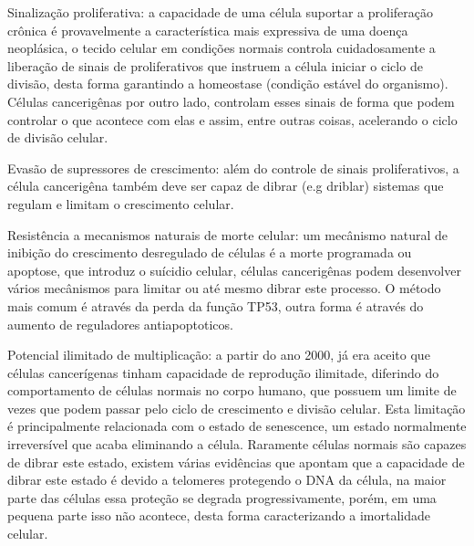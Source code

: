 \documentclass[12pt]{article}
\begin{document}
Sinalização proliferativa: a capacidade de uma célula suportar a proliferação crônica é provavelmente a característica mais expressiva de uma doença neoplásica, o tecido celular em condições normais controla cuidadosamente a liberação de sinais de proliferativos que instruem a célula iniciar o ciclo de divisão, desta forma garantindo a homeostase (condição estável do organismo).
Células cancerigênas por outro lado, controlam esses sinais de forma que podem controlar o que acontece com elas e assim, entre outras coisas, acelerando o ciclo de divisão celular.

Evasão de supressores de crescimento: além do controle de sinais proliferativos, a célula cancerigêna também deve ser capaz de dibrar (e.g driblar) sistemas que regulam e limitam o crescimento celular.

Resistência a mecanismos naturais de morte celular: um mecânismo natural de inibição do crescimento desregulado de células é a morte programada ou apoptose, que introduz o suícidio celular, células cancerigênas podem desenvolver vários mecânismos para limitar ou até mesmo dibrar este processo. O método mais comum é através da perda da função TP53, outra forma é através do aumento de reguladores antiapoptoticos.

Potencial ilimitado de multiplicação: a partir do ano 2000, já era aceito que células cancerígenas tinham capacidade de reprodução ilimitade, diferindo do comportamento de células normais no corpo humano, que possuem um limite de vezes que podem passar pelo ciclo de crescimento e divisão celular. Esta limitação é principalmente relacionada com o estado de senescence, um estado normalmente irreversível que acaba eliminando a célula. Raramente células normais são capazes de dibrar este estado, existem várias evidências que apontam que a capacidade de dibrar este estado é devido a telomeres protegendo o DNA da célula, na maior parte das células essa proteção se degrada progressivamente, porém, em uma pequena parte isso não acontece, desta forma caracterizando a imortalidade celular.





\end{document}
